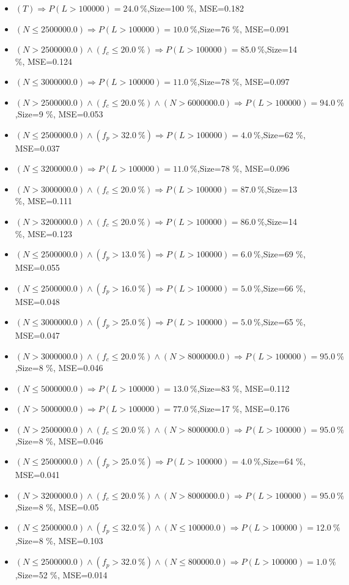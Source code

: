 \documentclass[numbered]{CSL}
\begin{document}
\begin{itemize}
\item $(T) \Rightarrow P(L > 100 000) = 24.0~\%$,\hfill Size=100 \%, MSE=0.182
\item $(N \leq 2500000.0) \Rightarrow P(L > 100 000) = 10.0~\%$,\hfill Size=76 \%, MSE=0.091
\item $(N > 2500000.0) \land (f_c \leq 20.0~\%) \Rightarrow P(L > 100 000) = 85.0~\%$,\hfill Size=14 \%, MSE=0.124
\item $(N \leq 3000000.0) \Rightarrow P(L > 100 000) = 11.0~\%$,\hfill Size=78 \%, MSE=0.097
\item $(N > 2500000.0) \land (f_c \leq 20.0~\%) \land (N > 6000000.0) \Rightarrow P(L > 100 000) = 94.0~\%$,\hfill Size=9 \%, MSE=0.053
\item $(N \leq 2500000.0) \land (f_p > 32.0~\%) \Rightarrow P(L > 100 000) = 4.0~\%$,\hfill Size=62 \%, MSE=0.037
\item $(N \leq 3200000.0) \Rightarrow P(L > 100 000) = 11.0~\%$,\hfill Size=78 \%, MSE=0.096
\item $(N > 3000000.0) \land (f_c \leq 20.0~\%) \Rightarrow P(L > 100 000) = 87.0~\%$,\hfill Size=13 \%, MSE=0.111
\item $(N > 3200000.0) \land (f_c \leq 20.0~\%) \Rightarrow P(L > 100 000) = 86.0~\%$,\hfill Size=14 \%, MSE=0.123
\item $(N \leq 2500000.0) \land (f_p > 13.0~\%) \Rightarrow P(L > 100 000) = 6.0~\%$,\hfill Size=69 \%, MSE=0.055
\item $(N \leq 2500000.0) \land (f_p > 16.0~\%) \Rightarrow P(L > 100 000) = 5.0~\%$,\hfill Size=66 \%, MSE=0.048
\item $(N \leq 3000000.0) \land (f_p > 25.0~\%) \Rightarrow P(L > 100 000) = 5.0~\%$,\hfill Size=65 \%, MSE=0.047
\item $(N > 3000000.0) \land (f_c \leq 20.0~\%) \land (N > 8000000.0) \Rightarrow P(L > 100 000) = 95.0~\%$,\hfill Size=8 \%, MSE=0.046
\item $(N \leq 5000000.0) \Rightarrow P(L > 100 000) = 13.0~\%$,\hfill Size=83 \%, MSE=0.112
\item $(N > 5000000.0) \Rightarrow P(L > 100 000) = 77.0~\%$,\hfill Size=17 \%, MSE=0.176
\item $(N > 2500000.0) \land (f_c \leq 20.0~\%) \land (N > 8000000.0) \Rightarrow P(L > 100 000) = 95.0~\%$,\hfill Size=8 \%, MSE=0.046
\item $(N \leq 2500000.0) \land (f_p > 25.0~\%) \Rightarrow P(L > 100 000) = 4.0~\%$,\hfill Size=64 \%, MSE=0.041
\item $(N > 3200000.0) \land (f_c \leq 20.0~\%) \land (N > 8000000.0) \Rightarrow P(L > 100 000) = 95.0~\%$,\hfill Size=8 \%, MSE=0.05
\item $(N \leq 2500000.0) \land (f_p \leq 32.0~\%) \land (N \leq 100000.0) \Rightarrow P(L > 100 000) = 12.0~\%$,\hfill Size=8 \%, MSE=0.103
\item $(N \leq 2500000.0) \land (f_p > 32.0~\%) \land (N \leq 800000.0) \Rightarrow P(L > 100 000) = 1.0~\%$,\hfill Size=52 \%, MSE=0.014
\end{itemize}
\end{document}
